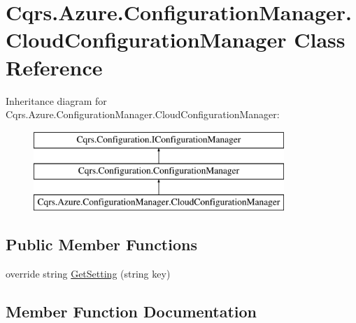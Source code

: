 \hypertarget{classCqrs_1_1Azure_1_1ConfigurationManager_1_1CloudConfigurationManager}{}\section{Cqrs.\+Azure.\+Configuration\+Manager.\+Cloud\+Configuration\+Manager Class Reference}
\label{classCqrs_1_1Azure_1_1ConfigurationManager_1_1CloudConfigurationManager}
Inheritance diagram for Cqrs.\+Azure.\+Configuration\+Manager.\+Cloud\+Configuration\+Manager\+:\begin{figure}[H]
\begin{center}
\leavevmode
\includegraphics[height=3.000000cm]{classCqrs_1_1Azure_1_1ConfigurationManager_1_1CloudConfigurationManager}
\end{center}
\end{figure}
\subsection*{Public Member Functions}
\begin{DoxyCompactItemize}
\item 
override string \hyperlink{classCqrs_1_1Azure_1_1ConfigurationManager_1_1CloudConfigurationManager_a48228b7e2204a2449426de32cd6ecc65}{Get\+Setting} (string key)
\end{DoxyCompactItemize}


\subsection{Member Function Documentation}
\mbox{\label{classCqrs_1_1Azure_1_1ConfigurationManager_1_1CloudConfigurationManager_a48228b7e2204a2449426de32cd6ecc65}} 
